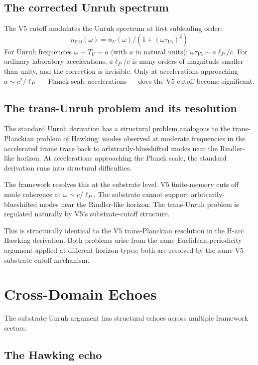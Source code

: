 \documentclass[11pt,a4paper]{article}
\begin{document}
\subsection{The corrected Unruh spectrum}

The V5 cutoff modulates the Unruh spectrum at first subleading order:
\[
n_{\mathrm{ED}}(\omega) = n_U(\omega) / (1 + (\omega \tau_{V5})^{2})
\]
For Unruh frequencies $\omega \sim T_U \sim a$ (with $a$ in natural units): $\omega\tau_{V5} \sim a\ell_P/c$. For ordinary laboratory accelerations, $a\ell_P/c$ is many orders of magnitude smaller than unity, and the correction is invisible. Only at accelerations approaching $a \sim c^{2}/\ell_P$ --- Planck-scale accelerations --- does the V5 cutoff become significant.

\subsection{The trans-Unruh problem and its resolution}

The standard Unruh derivation has a structural problem analogous to the trans-Planckian problem of Hawking: modes observed at moderate frequencies in the accelerated frame trace back to arbitrarily-blueshifted modes near the Rindler-like horizon. At accelerations approaching the Planck scale, the standard derivation runs into structural difficulties.

The framework resolves this at the substrate level. V5 finite-memory cuts off mode coherence at $\omega \sim c/\ell_P$. The substrate cannot support arbitrarily-blueshifted modes near the Rindler-like horizon. The trans-Unruh problem is regulated naturally by V5's substrate-cutoff structure.

This is structurally identical to the V5 trans-Planckian resolution in the H-arc Hawking derivation. Both problems arise from the same Euclidean-periodicity argument applied at different horizon types; both are resolved by the same V5 substrate-cutoff mechanism.

\section{Cross-Domain Echoes}

The substrate-Unruh argument has structural echoes across multiple framework sectors.

\subsection{The Hawking echo}
\end{document}
